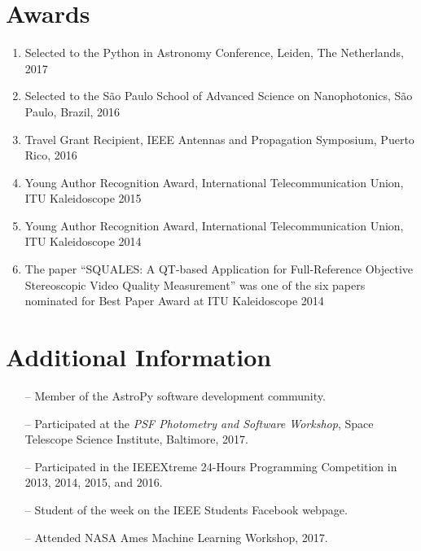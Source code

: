 \documentclass[10pt]{article}
\begin{document}
\begin{titlepage}
\section*{Awards}
\begin{enumerate}
  \item Selected to the Python in Astronomy Conference, Leiden, The Netherlands, 2017
  \item Selected to the S\~ao Paulo School of Advanced Science on Nanophotonics, S\~ao Paulo, Brazil, 2016
  \item Travel Grant Recipient, IEEE Antennas and Propagation Symposium, Puerto Rico, 2016
  \item Young Author Recognition Award, International Telecommunication Union, ITU Kaleidoscope 2015
  \item Young Author Recognition Award, International Telecommunication Union, ITU Kaleidoscope 2014
  \item The paper ``SQUALES: A QT-based Application for Full-Reference Objective Stereoscopic Video Quality Measurement'' was one of the six papers nominated for Best Paper Award at ITU Kaleidoscope 2014
\end{enumerate}

\section*{Additional Information}
\begin{itemize}
    \item[--] Member of the AstroPy software development community.
    \item[--] Participated at the \textit{PSF Photometry and Software Workshop}, Space Telescope Science Institute, Baltimore, 2017.
    \item[--] Participated in the IEEEXtreme 24-Hours Programming Competition in 2013, 2014, 2015, and 2016.
    \item[--] Student of the week on the IEEE Students Facebook webpage.
    \item[--] Attended NASA Ames Machine Learning Workshop, 2017.
\end{itemize}

\end{titlepage}
\end{document}
